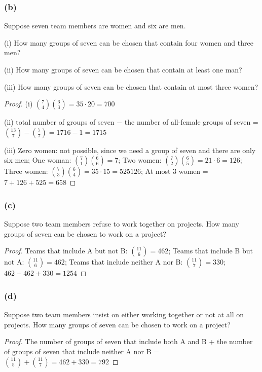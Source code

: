 \documentclass[14pt]{extarticle}
\begin{document}
\subsubsection{(b)}
Suppose seven team members are women and six are men.

(i) How many groups of seven can be chosen that contain four women and three men?

(ii) How many groups of seven can be chosen that contain at least one man?

(iii) How many groups of seven can be chosen that contain at most three women?

\begin{proof}
(i) \(\binom{7}{4}\binom{6}{3} = 35 \cdot 20 = 700\) 

(ii) total number of groups of seven \(-\) the number of all-female groups of seven = \(\binom{13}{7} - \binom{7}{7}
 = 1716 - 1 = 1715\)

(iii) Zero women: not possible, since we need a group of seven and there are only six men; One woman: \(\binom{7}{1}
\binom{6}{6} = 7\); Two women: \(\binom{7}{2}\binom{6}{5} = 21 \cdot 6 = 126\); Three women: \(\binom{7}{3}\binom{6}{4} 
= 35 \cdot 15 = 525 126\); At most 3 women = \(7 + 126 + 525 = 658\)
\end{proof}

\subsubsection{(c)}
Suppose two team members refuse to work together on projects. How many groups of seven can be chosen to work on 
a project?

\begin{proof}
Teams that include A but not B: \(\binom{11}{6} = 462\);
Teams that include B but not A: \(\binom{11}{6} = 462\);
Teams that include neither A nor B: \(\binom{11}{7}=330\);
\(462+462+330 = 1254\)
\end{proof}

\subsubsection{(d)}
Suppose two team members insist on either working together or not at all on projects. How many groups of seven can be 
chosen to work on a project?

\begin{proof}
The number of groups of seven that include both A and B + the number of groups of seven that include neither A nor B
= \(\binom{11}{5} + \binom{11}{7} = 462 + 330 = 792\)
\end{proof}
\end{document}
